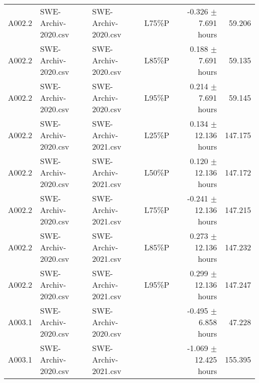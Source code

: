 \begin{longtable}{lllrrr}
 A002.2      & SWE-Archiv-2020.csv & SWE-Archiv-2020.csv &        L75\%P &  -0.326 $\pm$ 7.691 hours &  59.206 \\
 A002.2      & SWE-Archiv-2020.csv & SWE-Archiv-2020.csv &        L85\%P &   0.188 $\pm$ 7.691 hours &  59.135 \\
 A002.2      & SWE-Archiv-2020.csv & SWE-Archiv-2020.csv &        L95\%P &   0.214 $\pm$ 7.691 hours &  59.145 \\
 A002.2      & SWE-Archiv-2020.csv & SWE-Archiv-2021.csv &        L25\%P &  0.134 $\pm$ 12.136 hours & 147.175 \\
 A002.2      & SWE-Archiv-2020.csv & SWE-Archiv-2021.csv &        L50\%P &  0.120 $\pm$ 12.136 hours & 147.172 \\
 A002.2      & SWE-Archiv-2020.csv & SWE-Archiv-2021.csv &        L75\%P & -0.241 $\pm$ 12.136 hours & 147.215 \\
 A002.2      & SWE-Archiv-2020.csv & SWE-Archiv-2021.csv &        L85\%P &  0.273 $\pm$ 12.136 hours & 147.232 \\
 A002.2      & SWE-Archiv-2020.csv & SWE-Archiv-2021.csv &        L95\%P &  0.299 $\pm$ 12.136 hours & 147.247 \\
 A003.1      & SWE-Archiv-2020.csv & SWE-Archiv-2020.csv &               &  -0.495 $\pm$ 6.858 hours &  47.228 \\
 A003.1      & SWE-Archiv-2020.csv & SWE-Archiv-2021.csv &               & -1.069 $\pm$ 12.425 hours & 155.395 \\
\hline
\end{longtable}